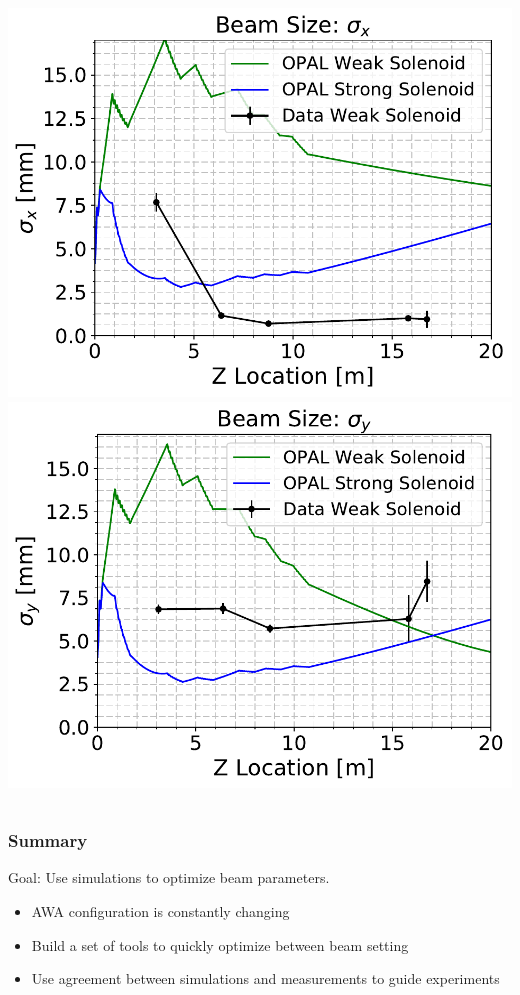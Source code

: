 \documentclass[professionalfonts,t]{beamer}
\begin{document}
\begin{frame}
\begin{columns}[T]
\begin{column}{.5\textwidth}
		\includegraphics[width=0.75\linewidth]{../images/beamsizes_3Dx} \\ \vspace{0.25em}
		\includegraphics[width=0.75\linewidth]{../images/beamsizes_3Dy}
	\end{column}%
\end{columns}
\end{frame}
\begin{frame}
	\frametitle{Summary}
	Goal: Use simulations to optimize beam parameters. 
	\begin{itemize}
		
		\item AWA configuration is constantly changing
		\item Build a set of tools to quickly optimize between beam setting
		\item Use agreement between simulations and measurements to guide experiments
	
	\end{itemize}
\end{frame}
\end{document}
